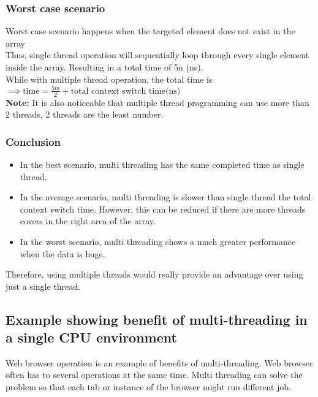 \subsubsection{Worst case scenario}
Worst case scenario happens when the targeted element does not exist in the array \\
Thus, single thread operation will sequentially loop through every single element inside the array. Resulting in a total time of 5n (ns). \\
While with multiple thread operation, the total time is 
$\implies \text{time} = \frac{5m}{2} + \text{total context switch time}  \text{(ns)} $\\

\textbf{Note:} It is also noticeable that multiple thread programming can use more than 2 threads, 2 threads are the least number.

\subsubsection{Conclusion}
\begin{itemize}
    \item In the best scenario, multi threading has the same completed time as single thread.
    \item In the average scenario, multi threading is slower than single thread the total context switch time. However, this can be reduced if there are more threads covers in the right area of the array.
    \item In the worst scenario, multi threading shows a much greater performance when the data is huge.
\end{itemize}
Therefore, using multiple threads would really provide an advantage over using just a single thread.


\subsection{Example showing benefit of multi-threading in a single CPU environment}
Web browser operation is an example of benefits of multi-threading. Web browser often has to several operations at the same time. Multi threading can solve the problem so that each tab or instance of the browser might run different job.



